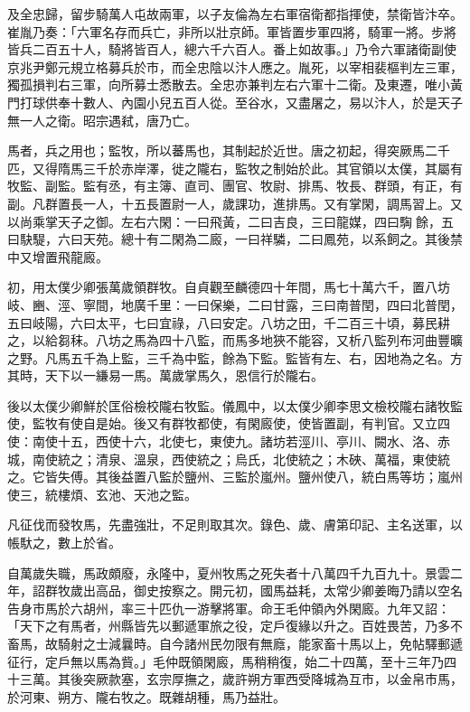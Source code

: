 \begin{pinyinscope}
 及全忠歸，留步騎萬人屯故兩軍，以子友倫為左右軍宿衛都指揮使，禁衛皆汴卒。崔胤乃奏：「六軍名存而兵亡，非所以壯京師。軍皆置步軍四將，騎軍一將。步將皆兵二百五十人，騎將皆百人，總六千六百人。番上如故事。」乃令六軍諸衛副使京兆尹鄭元規立格募兵於市，而全忠陰以汴人應之。胤死，以宰相裴樞判左三軍，獨孤損判右三軍，向所募士悉散去。全忠亦兼判左右六軍十二衛。及東遷，唯小黃門打球供奉十數人、內園小兒五百人從。至谷水，又盡屠之，易以汴人，於是天子無一人之衛。昭宗遇弒，唐乃亡。



 馬者，兵之用也；監牧，所以蕃馬也，其制起於近世。唐之初起，得突厥馬二千匹，又得隋馬三千於赤岸澤，徙之隴右，監牧之制始於此。其官領以太僕，其屬有牧監、副監。監有丞，有主簿、直司、團官、牧尉、排馬、牧長、群頭，有正，有副。凡群置長一人，十五長置尉一人，歲課功，進排馬。又有掌閑，調馬習上。又以尚乘掌天子之御。左右六閑：一曰飛黃，二曰吉良，三曰龍媒，四曰騊餘，五曰駃騠，六曰天苑。總十有二閑為二廄，一曰祥驎，二曰鳳苑，以系飼之。其後禁中又增置飛龍廄。



 初，用太僕少卿張萬歲領群牧。自貞觀至麟德四十年間，馬七十萬六千，置八坊岐、豳、涇、寧間，地廣千里：一曰保樂，二曰甘露，三曰南普閏，四曰北普閏，五曰岐陽，六曰太平，七曰宜祿，八曰安定。八坊之田，千二百三十頃，募民耕之，以給芻秣。八坊之馬為四十八監，而馬多地狹不能容，又析八監列布河曲豐曠之野。凡馬五千為上監，三千為中監，餘為下監。監皆有左、右，因地為之名。方其時，天下以一縑易一馬。萬歲掌馬久，恩信行於隴右。



 後以太僕少卿鮮於匡俗檢校隴右牧監。儀鳳中，以太僕少卿李思文檢校隴右諸牧監使，監牧有使自是始。後又有群牧都使，有閑廄使，使皆置副，有判官。又立四使：南使十五，西使十六，北使七，東使九。諸坊若涇川、亭川、闕水、洛、赤城，南使統之；清泉、溫泉，西使統之；烏氏，北使統之；木硤、萬福，東使統之。它皆失傅。其後益置八監於鹽州、三監於嵐州。鹽州使八，統白馬等坊；嵐州使三，統樓煩、玄池、天池之監。



 凡征伐而發牧馬，先盡強壯，不足則取其次。錄色、歲、膚第印記、主名送軍，以帳馱之，數上於省。



 自萬歲失職，馬政頗廢，永隆中，夏州牧馬之死失者十八萬四千九百九十。景雲二年，詔群牧歲出高品，御史按察之。開元初，國馬益耗，太常少卿姜晦乃請以空名告身市馬於六胡州，率三十匹仇一游擊將軍。命王毛仲領內外閑廄。九年又詔：「天下之有馬者，州縣皆先以郵遞軍旅之役，定戶復緣以升之。百姓畏苦，乃多不畜馬，故騎射之士減曩時。自今諸州民勿限有無廕，能家畜十馬以上，免帖驛郵遞征行，定戶無以馬為貲。」毛仲既領閑廄，馬稍稍復，始二十四萬，至十三年乃四十三萬。其後突厥款塞，玄宗厚撫之，歲許朔方軍西受降城為互市，以金帛市馬，於河東、朔方、隴右牧之。既雜胡種，馬乃益壯。




\end{pinyinscope}
